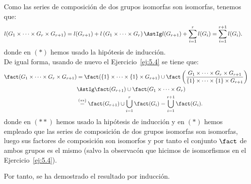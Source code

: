 \begin{ejercicio}
\begin{itemize}
        Como las series de composición de dos grupos isomorfas son isomorfas, tenemos que:
        \begin{align*}
            l(G_1 \times \cdots \times G_r \times G_{r+1}) &= l(G_{r+1}) + l\left(G_1 \times \cdots \times G_r\right) \AstIg
             l(G_{r+1}) + \sum_{i=1}^{r} l(G_i)
            = \sum_{i=1}^{r+1} l(G_i).
        \end{align*}
        donde en $(\ast)$ hemos usado la hipótesis de inducción.\\

        De igual forma, usando de nuevo el Ejercicio~\ref{ej:5.4} se tiene que:
        \begin{align*}
            \fact(G_1 \times \cdots \times G_r \times G_{r+1}) &= \fact(\{1\}\times \cdots \times \{1\} \times G_{r+1}) \cup \fact\left(\dfrac{G_1 \times \cdots \times G_r \times G_{r+1}}{\{1\}\times \cdots \times \{1\} \times G_{r+1}}\right)\\
            &\AstIg \fact(G_{r+1})\cup\fact(G_1\times\cdots\times G_r)\\
            &\stackrel{(\ast\ast)}{=} \fact(G_{r+1})\cup \bigcup_{i=1}^{r} \fact(G_i) = \bigcup_{i=1}^{r+1} \fact(G_i).
        \end{align*}
        donde en $(\ast\ast)$ hemos usado la hipótesis de inducción y en $(\ast)$ hemos empleado que las series de composición de dos grupos isomorfas son isomorfas, luego sus factores de composición son isomorfos y por tanto el conjunto $\fact$ de ambos grupos es el mismo (salvo la observacón que hicimos de isomorfismos en el Ejercicio~\ref{ej:5.4}).
    \end{itemize}

    Por tanto, se ha demostrado el resultado por inducción.
\end{ejercicio}

